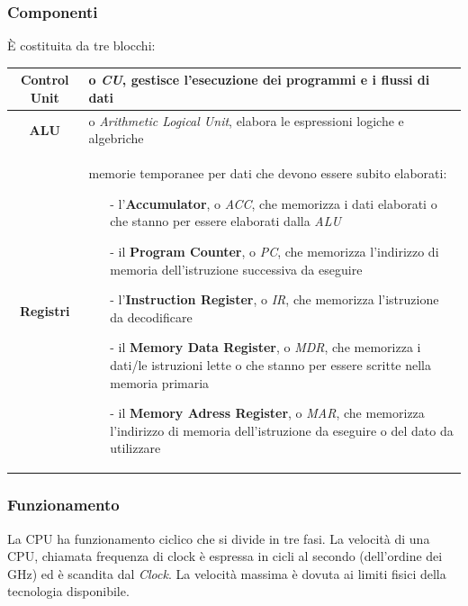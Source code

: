 \documentclass[a4paper]{article}
\begin{document}
\subsubsection*{Componenti}
È costituita da tre blocchi:
\begin{center}	
	\begin{tabularx}{\textwidth}{c X}
		\textbf{Control Unit} & o \textit{CU}, gestisce l'esecuzione dei programmi e i flussi di dati \\
		\midrule
		\textbf{ALU} & o \textit{Arithmetic Logical Unit}, elabora le espressioni logiche e algebriche \\
		\midrule
		\textbf{Registri} & memorie temporanee per dati che devono essere subito elaborati:
		\begin{itemize}[topsep=3pt, itemsep=0pt]
			\item[-] l'\textbf{Accumulator}, o \textit{ACC}, che memorizza i dati elaborati o che stanno per essere elaborati dalla \textit{ALU}
			\item[-] il \textbf{Program Counter}, o \textit{PC}, che memorizza l'indirizzo di memoria dell'istruzione successiva da eseguire
			\item[-] l'\textbf{Instruction Register}, o \textit{IR}, che memorizza l'istruzione da decodificare
			\item[-] il \textbf{Memory Data Register},	o \textit{MDR}, che memorizza i dati/le istruzioni lette o che stanno per essere scritte nella memoria primaria
			\item[-] il \textbf{Memory Adress Register}, o \textit{MAR}, che memorizza l'indirizzo di memoria dell'istruzione da eseguire o del dato da utilizzare
		\end{itemize}
	\end{tabularx}
\end{center}

\subsubsection*{Funzionamento}
La CPU ha funzionamento ciclico che si divide in tre fasi. La velocità di una CPU, chiamata frequenza di clock è espressa
in cicli al secondo (dell'ordine dei GHz) ed è scandita dal \textit{Clock}. La velocità massima è dovuta ai limiti fisici
della tecnologia disponibile.
\end{document}

